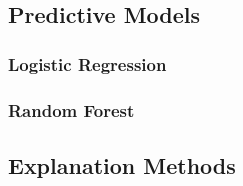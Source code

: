 \documentclass[english]{tktltiki2}
\theoremstyle{definition}
\theoremstyle{remark}
\begin{document}
\subsection{Predictive Models}%

\subsubsection{Logistic Regression} %

\subsubsection{Random Forest} %

\subsection{Explanation Methods} %
\end{document}
